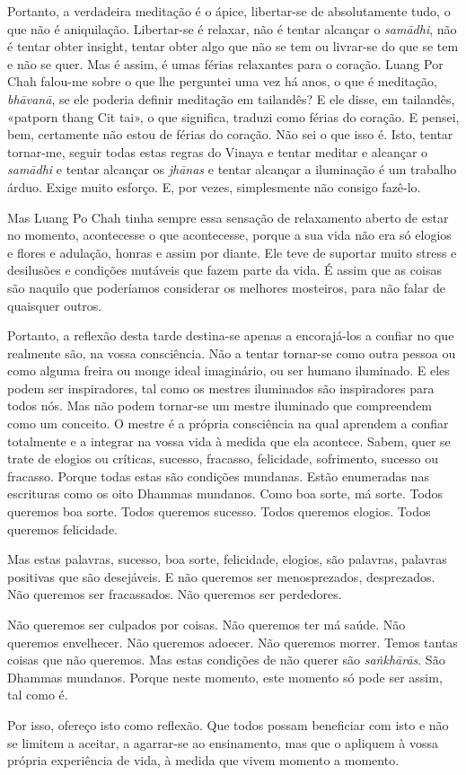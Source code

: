 Portanto, a verdadeira meditação é o ápice, libertar-se de absolutamente tudo,
o que não é aniquilação. Libertar-se é relaxar, não é tentar alcançar o
\emph{samādhi}, não é tentar obter insight, tentar obter algo que não se tem ou
livrar-se do que se tem e não se quer. Mas é assim, é umas férias relaxantes
para o coração. Luang Por Chah falou-me sobre o que lhe perguntei uma vez há
anos, o que é meditação, \emph{bhāvanā}, se ele poderia definir meditação em tailandês?
E ele disse, em tailandês, «patporn thang Cit tai», o que significa, traduzi
como férias do coração. E pensei, bem, certamente não estou de férias do
coração. Não sei o que isso é. Isto, tentar tornar-me, seguir todas estas
regras do Vinaya e tentar meditar e alcançar o \emph{samādhi} e tentar alcançar os
\emph{jhānas} e tentar alcançar a iluminação é um trabalho árduo. Exige muito esforço.
E, por vezes, simplesmente não consigo fazê-lo.

Mas Luang Po Chah tinha sempre essa sensação de relaxamento aberto de estar no
momento, acontecesse o que acontecesse, porque a sua vida não era só elogios e
flores e adulação, honras e assim por diante. Ele teve de suportar muito stress
e desilusões e condições mutáveis que fazem parte da vida. É assim que as coisas
são naquilo que poderíamos considerar os melhores mosteiros, para não falar de
quaisquer outros.

Portanto, a reflexão desta tarde destina-se apenas a encorajá-los a confiar no
que realmente são, na vossa consciência. Não a tentar tornar-se como outra
pessoa ou como alguma freira ou monge ideal imaginário, ou ser humano iluminado.
E eles podem ser inspiradores, tal como os mestres iluminados são inspiradores
para todos nós. Mas não podem tornar-se um mestre iluminado que compreendem
como um conceito. O mestre é a própria consciência na qual aprendem a confiar
totalmente e a integrar na vossa vida à medida que ela acontece. Sabem, quer se
trate de elogios ou críticas, sucesso, fracasso, felicidade, sofrimento, sucesso
ou fracasso. Porque todas estas são condições mundanas. Estão enumeradas nas
escrituras como os oito Dhammas mundanos. Como boa sorte, má sorte. Todos
queremos boa sorte. Todos queremos sucesso. Todos queremos elogios. Todos
queremos felicidade.

Mas estas palavras, sucesso, boa sorte, felicidade, elogios, são palavras,
palavras positivas que são desejáveis. E não queremos ser menosprezados,
desprezados. Não queremos ser fracassados. Não queremos ser perdedores.

Não queremos ser culpados por coisas. Não queremos ter má saúde. Não queremos
envelhecer. Não queremos adoecer. Não queremos morrer. Temos tantas coisas que
não queremos. Mas estas condições de não querer são \emph{saṅkhārās}. São Dhammas
mundanos. Porque neste momento, este momento só pode ser assim, tal como é.

Por isso, ofereço isto como reflexão. Que todos possam beneficiar com isto e não
se limitem a aceitar, a agarrar-se ao ensinamento, mas que o apliquem à vossa
própria experiência de vida, à medida que vivem momento a momento.
